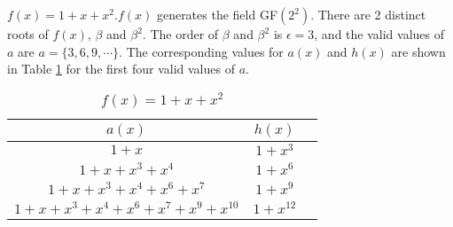 \begin{example}
$f(x)=1+x+x^2$.\newline $f(x)$ generates the field GF$(2^2)$. There are 2 distinct roots of $f(x)$, $\beta$ and $\beta^2$. The order of $\beta$ and $\beta^2$ is $\epsilon=3$, and the  valid values of $a$ are $a=\{3,6,9,\cdots \}$. The corresponding values for $a(x)$ and $h(x)$ are shown in Table \ref{novelTab2} for the first four valid values of $a$.
\begin{table}[htbp]
 \caption{$f(x)=1+x+x^2$}
\centering
 \begin{tabular}{c c c} 
 $a(x)$ & $h(x)$ \\ [0.5ex] 
 \hline\hline
$1+x$
 & $1+x^{3}$ \\
\hline
$1+x+x^3+x^4$
 & $1+x^{6}$ 
 \\
\hline
$1+x+x^3+x^4+x^6+x^{7}$ 
&  $1+x^{9}$ 
\\
\hline
$1+x+x^3+x^4+x^6+x^{7}+x^9+x^{10}$
 &  $1+x^{12}$ \\
 \end{tabular}
 \label{novelTab2}
\end{table}
\end{example}

